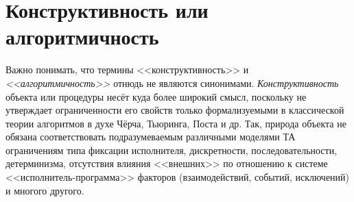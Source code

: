 \section{Конструктивность или алгоритмичность}

\let\define\emph

Важно понимать, что термины <<конструктивность>> и \define{<<алгоритмичность>>} отнюдь не являются синонимами. \define{Конструктивность} объекта или процедуры несёт куда более широкий смысл, поскольку
не утверждает ограниченности его свойств только формализуемыми в классической теории алгоритмов в духе Чёрча, Тьюринга, Поста и др. Так, природа объекта не обязана соответствовать подразумеваемым
различными моделями ТА ограничениям типа фиксации исполнителя, дискретности, последовательности, детерминизма, отсутствия влияния <<внешних>> по отношению к системе <<исполнитель-программа>> факторов (взаимодействий, событий, исключений) и многого другого.

